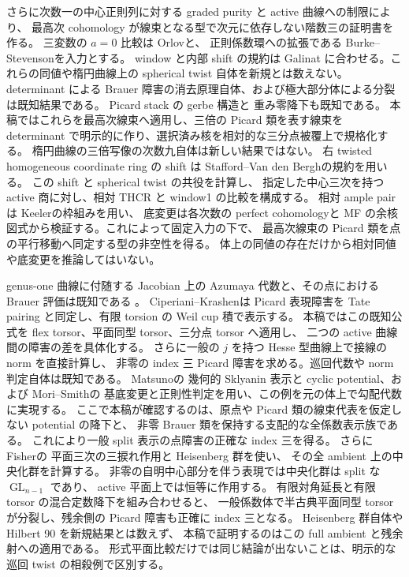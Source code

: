 さらに次数一の中心正則列に対する graded purity と active 曲線への制限により、
最高次 cohomology が線束となる型で次元に依存しない階数三の証明書を作る。
三変数の $a=0$ 比較は Orlov\cite[Theorem~2.5(iii)]{NFMOrlovSingularities}と、
正則係数環への拡張である Burke--Stevenson\cite[Theorem~6.4(3)]{NFMBurkeStevenson}を入力とする。
window と内部 shift の規約は Galinat\cite[Section~1.1, Lemma~1.2; proof of Lemma~2.7]{NFMGalinat}
に合わせる。これらの同値や楕円曲線上の spherical twist 自体を新規とは数えない。
determinant による Brauer 障害の消去原理自体、および極大部分体による分裂
\cite{NFMStacksSplitting}は既知結果である。
Picard stack の gerbe 構造\cite{NFMStacksPicardGerbe}と
重み零降下\cite[Proposition~4.10]{NFMBerghSchnurer}も既知である。
本稿ではこれらを最高次線束へ適用し、三倍の Picard 類を表す線束を
determinant で明示的に作り、選択済み核を相対的な三分点被覆上で規格化する。
楕円曲線の三倍写像の次数九\cite{NFMStacksMultiplication}自体は新しい結果ではない。
右 twisted homogeneous coordinate ring の shift は
Stafford--Van den Bergh\cite[\S3, equation~(3.1)]{NFMStaffordVdB}の規約を用いる。
この shift と spherical twist の共役を計算し、
指定した中心三次を持つ active 商に対し、相対 THCR と window1 の比較を構成する。
相対 ample pair は Keeler\cite[Proposition~7.2, Lemma~7.6]{NFMKeelerAmple}の枠組みを用い、
底変更は各次数の perfect cohomology\cite{NFMStacksPerfectBasechange}と
MF の余核図式から検証する。これによって固定入力の下で、
最高次線束の Picard 類を点の平行移動へ同定する型の非空性を得る。
体上の同値の存在だけから相対同値や底変更を推論してはいない。

genus-one 曲線に付随する Jacobian 上の Azumaya 代数と、その点における
Brauer 評価は既知である
\cite[Theorems~1.1--1.2, Corollary~1.4]{NFMFisherGenusOneAlgebras}。
Ciperiani--Krashen\cite[Theorems~3.1, 3.7]{NFMCiperianiKrashen}は
Picard 表現障害を Tate pairing と同定し、有限 torsion の Weil cup 積で表示する。
本稿ではこの既知公式を flex torsor、平面同型 torsor、三分点 torsor へ適用し、
二つの active 曲線間の障害の差を具体化する。
さらに一般の $j$ を持つ Hesse 型曲線上で接線の norm を直接計算し、
非零の index 三 Picard 障害を求める。巡回代数や norm 判定\cite{NFMMilneCFT}自体は既知である。
Matsuno\cite[\S2.4, Lemma~2.16, Theorem~3.3, \S4]{NFMMatsunoElliptic}の
幾何的 Sklyanin 表示と cyclic potential、および
Mori--Smith\cite[Proposition~2.11, Theorem~4.2(1)]{MoriSmith}の
基底変更と正則性判定を用い、この例を元の体上で勾配代数に実現する。
ここで本稿が確認するのは、原点や Picard 類の線束代表を仮定しない potential の降下と、
非零 Brauer 類を保持する支配的な全係数表示族である。
これにより一般 split 表示の点障害の正確な index 三を得る。
さらに Fisher\cite[proof of Lemma~2.3, \S9.5]{NFMFisherTernary}の
平面三次の三捩れ作用と Heisenberg 群を使い、
その全 ambient 上の中央化群を計算する。
非零の自明中心部分を伴う表現では中央化群は split な $\operatorname{GL}_{n-1}$ であり、
active 平面上では恒等に作用する。
有限対角延長と有限 torsor の混合定数降下を組み合わせると、
一般係数体で半古典平面同型 torsor が分裂し、残余側の Picard 障害も正確に index 三となる。
Heisenberg 群自体や Hilbert 90 を新規結果とは数えず、
本稿で証明するのはこの full ambient と残余射への適用である。
形式平面比較だけでは同じ結論が出ないことは、明示的な巡回 twist の相殺例で区別する。

